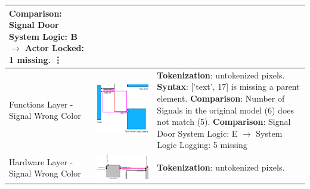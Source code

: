 \begin{longtable}{p{} >{\raggedright\arraybackslash}m{} >{\raggedright\arraybackslash}m{}}
        \textbf{Comparison}: Signal Door System Logic: B $\rightarrow$ Actor Locked: 1 missing. \newline
        \vdots \\
    \midrule
    Functions Layer - Signal Wrong Color & \includegraphics[width=\linewidth]{pictures/32_signal_wrong_color_output_clip.png} & 
        \textbf{Tokenization}: untokenized pixels. \newline
        \textbf{Syntax}: ['text', 17] is missing a parent element. \newline
        \textbf{Comparison}: Number of Signals in the original model (6) does not match (5). \newline
        \textbf{Comparison}: Signal Door System Logic: E $\rightarrow$ System Logic Logging: 5 missing \\
    \midrule
    Hardware Layer - Signal Wrong Color & \includegraphics[width=\linewidth]{pictures/33_signal_wrong_color_output_clip.png} & \textbf{Tokenization}: untokenized pixels. \\

\end{longtable}
